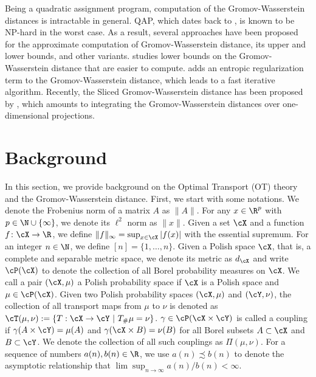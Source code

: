 \documentclass[11pt]{article}
\begin{document}
Being a quadratic assignment program, computation of the Gromov-Wasserstein distances is intractable in general. QAP, which dates back to \cite{koopmans1957AssignmentProblems}, is known to be NP-hard \citep{cela1998QuadraticAssignment} in the worst case. As a result, several approaches have been proposed for the approximate computation of Gromov-Wasserstein distance, its upper and lower bounds, and other variants. \cite{memoli_2011} studies lower bounds on the Gromov-Wasserstein distance that are easier to compute. \cite{peyre_etal_2016} adds an entropic regularization term to the Gromov-Wasserstein distance, which leads to a fast iterative algorithm. Recently, the Sliced Gromov-Wasserstein distance has been proposed by \cite{titouan_etal_2019}, which amounts to integrating the Gromov-Wasserstein distances over one-dimensional projections.







\section{Background}
\label{sec:background}
In this section, we provide background on the Optimal Transport (OT) theory and the Gromov-Wasserstein distance. First, we start with some notations. We denote the Frobenius norm of a matrix $A$ as $\|A\|$. For any $x \in \R^p$ with $p \in \N \cup \{\infty\}$, we denote its $\ell^2$ norm as $\|x\|$. Given a set $\cX$ and a function $f \colon \cX \to \R$, we define $\|f\|_\infty = \sup_{x \in \cX} |f(x)|$ with the essential supremum. For an integer $n \in \N$, we define $[n] = \{1, \ldots, n\}$. Given a Polish space $\cX$, that is, a complete and separable metric space, we denote its metric as $d_{\cX}$ and write $\cP(\cX)$ to denote the collection of all Borel probability measures on $\cX$. We call a pair $(\cX, \mu)$ a Polish probability space if $\cX$ is a Polish space and $\mu \in \cP(\cX)$. Given two Polish probability spaces $(\cX, \mu)$ and $(\cY, \nu)$, the collection of all transport maps from $\mu$ to $\nu$ is denoted as $\cT(\mu, \nu) := \{ T:\cX \rightarrow \cY ~|~ T_\# \mu = \nu \}$. $\gamma \in \cP(\cX \times \cY)$ is called a coupling if $\gamma(A \times \cY) = \mu(A)$ and $\gamma(\cX \times B) = \nu(B)$ for all Borel subsets $A \subset \cX$ and $B \subset \cY$. We denote the collection of all such couplings as $\Pi(\mu, \nu)$. For a sequence of numbers $a(n), b(n) \in \R$, we use $a(n)\precsim b(n)$ to denote the asymptotic relationship that $\lim\sup_{n \rightarrow \infty} a(n)/b(n) < \infty$.
\end{document}
